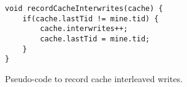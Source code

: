 \begin{comment}
\begin{table*}
\centering
\begin{tabular}{|l|rrrr|rr|r|}
\hline
{\bf \small Benchmark} & {\bf \small PagesWritten} & {\bf \small Commits} & {\bf Allocs} & {\bf \small CleanupSize} & {\bf \small TranLength(ms)} & {\bf \small PagesPerTran} & {\bf \small PagesPerMs}\\
\hline
\small \textbf{histogram} & 0 & 24 & 2 & 0 & 12.5 & 0 & 0\\
\small \textbf{kmeans} & 1312 & 3836 & 101002 & 0 & 4.15 & 0.34 & 0.08\\
\small \textbf{linear\_regression} & 16 & 24 & 3 & 0 & 38.6 & 0.67 & 0.02\\
\small \textbf{matrix\_multiply} & 16 & 24 & 11 & 0 & 313.23 & 0.67 & 0.0\\
\small \textbf{pca} & 0 & 47 & 2 & 0 & 450.69 & 0 & 0.0\\
\small \textbf{reverseindex} & 260201 & 156409 & 250927 & 0 & 0.05 & 1.66 & 30.99 \\
\small \textbf{string\_match} & 0 & 24 & 7 & 0 & 104.75 & 0 & 0.00\\
\small \textbf{word\_count} & 145 & 89 & 38 & 32 & 25.08 & 1.63 & 0.06\\
\hline
\small \textbf{blackscholes} & 0 & 23 & 4 & 0 & 453.51 & 0 & 0.0\\
\small \textbf{canneal} & 8 & 1056 & 5974612 & 0 & 10.32 & 0.01 & 0.0\\
\small \textbf{dedup} & 76184 & 45636 & 8291 & 0 & 0.04 & 1.67 & 44.9\\
\small \textbf{ferret} & 904381 & 1072258 & 110558 & 0 & 0.01 & 0.84 & 76.04\\
\small \textbf{fluidanimate} & 8 & 10018550 & 135430 & 352 & 0.00 & 0.00 & 0.00\\
\small \textbf{freqmine} & 0 & 1 & 33 & 0 & 11524.6 & 0 & 0.0 \\
\small \textbf{streamcluster} & 32824 & 128557 & 12 & 294 & 0.02 & 0.26 & 10.42\\
\small \textbf{swaptions} & 48 & 24 & 388 & 0 & 167.23 & 2 & 0.01\\
\hline
\end{tabular}
\caption{Characteristics of benchmarks. 
\label{table:characteristics}}
\end{table*}
\end{comment}

\begin{figure}[!t]
\begin{lstlisting}
void recordCacheInterwrites(cache) {
	if(cache.lastTid != mine.tid) {
		cache.interwrites++;
		cache.lastTid = mine.tid;
	}
}
\end{lstlisting}
\caption{Pseudo-code to record cache interleaved writes.\label{fig:capturecacheinvalidation}}
\end{figure}

